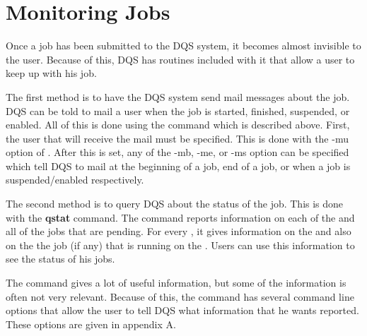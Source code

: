 \section{Monitoring Jobs}

Once a job has been submitted to the DQS system, it becomes almost
invisible to the user.  Because of this, DQS has routines included
with it that allow a user to keep up with his job.

The first method is to have the DQS system send mail messages about
the job.  DQS can be told to mail a user when the job is started,
finished, suspended, or enabled.  All of this is done using the \qsub
command which is described above.  First, the user that will receive
the mail must be specified.  This is done with the -mu option of
\qsub.  After this is set, any of the -mb, -me, or -ms option can be
specified which tell DQS to mail at the beginning of a job, end of a
job, or when a job is suspended/enabled respectively.

The second method is to query DQS about the status of the job.  This
is done with the {\bf qstat} command.  The \qstat command reports
information on each of the \queues and all of the jobs that are pending.
For every \queue, it gives
information on the \queue and also on the the job (if any) that is
running on the \queue.
Users can use this information to see the
status of his jobs.

The \qstat command gives a lot of useful information, but some of the
information is often not very relevant.  Because of this, the \qstat command
has several command line options that allow the user to tell DQS what
information that he wants reported.  These options are given in
appendix A.

